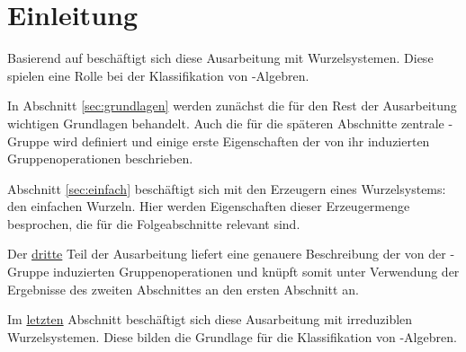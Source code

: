 \section*{Einleitung}

Basierend auf \cite[S.49-55]{humphreys1972introduction} beschäftigt sich diese Ausarbeitung mit Wurzelsystemen.
Diese spielen eine Rolle bei der Klassifikation von \lie\hyp{}Algebren.

In Abschnitt \ref{sec:grundlagen} werden zunächst die für den Rest der Ausarbeitung wichtigen Grundlagen behandelt.
Auch die für die späteren Abschnitte zentrale \weyl\hyp{}Gruppe wird definiert und einige erste Eigenschaften der von ihr induzierten Gruppenoperationen beschrieben.

Abschnitt \ref{sec:einfach} beschäftigt sich mit den Erzeugern eines Wurzelsystems: den einfachen Wurzeln. 
Hier werden Eigenschaften dieser Erzeugermenge besprochen, die für die Folgeabschnitte relevant sind.

Der \hyperref[sec:weylgroup]{dritte} Teil der Ausarbeitung liefert eine genauere Beschreibung der von der \weyl\hyp{}Gruppe induzierten Gruppenoperationen und knüpft somit unter Verwendung der Ergebnisse des zweiten Abschnittes an den ersten Abschnitt an.

Im \hyperref[sec:irreduc]{letzten} Abschnitt beschäftigt sich diese Ausarbeitung mit irreduziblen Wurzelsystemen. 
Diese bilden die Grundlage für die Klassifikation von \lie\hyp{}Algebren.
